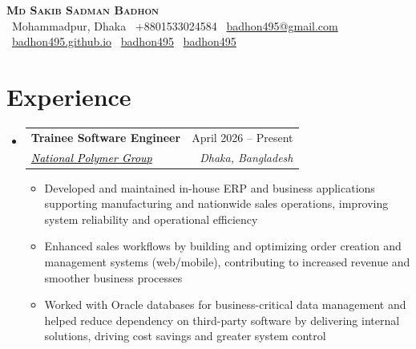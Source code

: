 \documentclass[a4paper]{article}
\makeatletter
\newcommand{\resumeItem}[1]{
  \item\small{
    {#1 \vspace{-2pt}}
  }
}
\newcommand{\resumeSubheading}[4]{
  \vspace{-2pt}\item
    \begin{tabular*}{0.97\textwidth}[t]{l@{\extracolsep{\fill}}r}
      \textbf{#1} & #2 \\
      \textit{\small#3} & \textit{\small #4} \\
    \end{tabular*}\vspace{-7pt}
}
\newcommand{\resumeSubHeadingListStart}{\begin{itemize}[leftmargin=0.15in, label={}]}
\newcommand{\resumeSubHeadingListEnd}{\end{itemize}}
\newcommand{\resumeItemListStart}{\begin{itemize}}
\newcommand{\resumeItemListEnd}{\end{itemize}\vspace{-5pt}}
\makeatother
\begin{document}
\begin{center}
    \textbf{\Huge \scshape Md Sakib Sadman Badhon} \\ \vspace{4pt}
    \small
    \faMapMarker*~Mohammadpur, Dhaka \enspace
    ~+8801533024584 \enspace
    \faEnvelope~\href{mailto:badhon495@gmail.com}{badhon495@gmail.com} \enspace
    \faGlobe~\href{https://badhon495.github.io/}{badhon495.github.io} \enspace
    \faLinkedin~\href{https://linkedin.com/in/badhon495/}{badhon495} \enspace
    \faGithub~\href{https://github.com/badhon495}{badhon495} \enspace
\end{center}




\section{Experience}
  \resumeSubHeadingListStart

    \resumeSubheading
      {Trainee Software Engineer}{April 2026 -- Present}
      {\href{https://www.nationalpolymer.net/}{\textcolor{black}{National Polymer Group}}}{Dhaka, Bangladesh}
      \resumeItemListStart
        \resumeItem{Developed and maintained in-house ERP and business applications supporting manufacturing and nationwide sales operations, improving system reliability and operational efficiency}
        \resumeItem{Enhanced sales workflows by building and optimizing order creation and management systems (web/mobile), contributing to increased revenue and smoother business processes}
        \resumeItem{Worked with Oracle databases for business-critical data management and helped reduce dependency on third-party software by delivering internal solutions, driving cost savings and greater system control}
      \resumeItemListEnd

  \resumeSubHeadingListEnd
\end{document}
